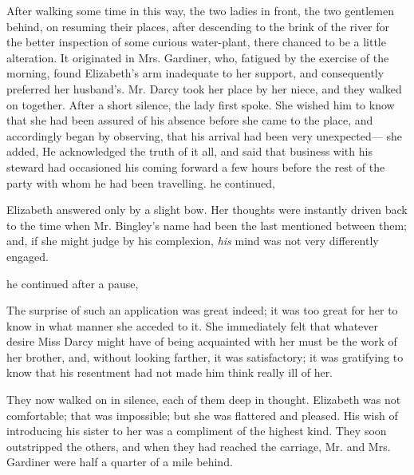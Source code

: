 After walking some time in this way, the two ladies in front, the two gentlemen behind, on resuming their places, after descending to the brink of the river for the better inspection of some curious water-plant, there chanced to be a little alteration. It originated in Mrs. Gardiner, who, fatigued by the exercise of the morning, found Elizabeth's arm inadequate to her support, and consequently preferred her husband's. Mr. Darcy took her place by her niece, and they walked on together. After a short silence, the lady first spoke. She wished him to know that she had been assured of his absence before she came to the place, and accordingly began by observing, that his arrival had been very unexpected--- she added,  He acknowledged the truth of it all, and said that business with his steward had occasioned his coming forward a few hours before the rest of the party with whom he had been travelling.  he continued, 

Elizabeth answered only by a slight bow. Her thoughts were instantly driven back to the time when Mr. Bingley's name had been the last mentioned between them; and, if she might judge by his complexion, {\em his} mind was not very differently engaged.

 he continued after a pause, 

The surprise of such an application was great indeed; it was too great for her to know in what manner she acceded to it. She immediately felt that whatever desire Miss Darcy might have of being acquainted with her must be the work of her brother, and, without looking farther, it was satisfactory; it was gratifying to know that his resentment had not made him think really ill of her.

They now walked on in silence, each of them deep in thought. Elizabeth was not comfortable; that was impossible; but she was flattered and pleased. His wish of introducing his sister to her was a compliment of the highest kind. They soon outstripped the others, and when they had reached the carriage, Mr. and Mrs. Gardiner were half a quarter of a mile behind.

